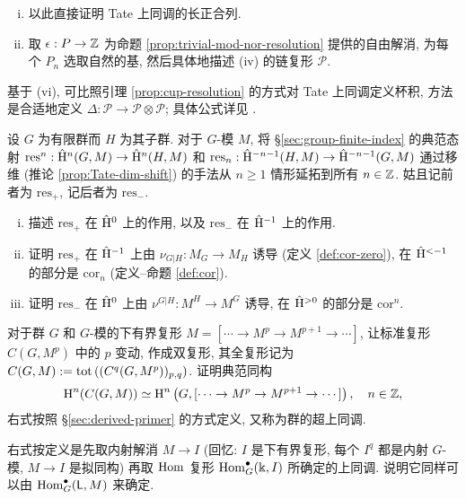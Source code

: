 \begin{Exercises}
\begin{enumerate}[(i)]
		\item 以此直接证明 Tate 上同调的长正合列.
		
		\item 取 $\epsilon: P \to \mathbb{Z}$ 为命题 \ref{prop:trivial-mod-nor-resolution} 提供的自由解消, 为每个 $P_n$ 选取自然的基, 然后具体地描述 (iv) 的链复形 $\mathcal{P}$.
	\end{enumerate}

	基于 (vi), 可比照引理 \ref{prop:cup-resolution} 的方式对 Tate 上同调定义杯积, 方法是合适地定义 $\Delta: \mathcal{P} \to \mathcal{P} \otimes \mathcal{P}$; 具体公式详见 \cite[Chapter IV, \S 7]{CF67}.

	\item 设 $G$ 为有限群而 $H$ 为其子群. 对于 $G$-模 $M$, 将 \S\ref{sec:group-finite-index} 的典范态射 $\mathrm{res}^n: \hat{\mathrm{H}}^n(G, M) \to \hat{\mathrm{H}}^n(H, M)$ 和 $\mathrm{res}_n: \hat{\mathrm{H}}^{-n-1}(H, M) \to \hat{\mathrm{H}}^{-n-1}(G, M)$ 通过移维 (推论 \ref{prop:Tate-dim-shift}) 的手法从 $n \geq 1$ 情形延拓到所有 $n \in \mathbb{Z}$. 姑且记前者为 $\mathrm{res}_+$, 记后者为 $\mathrm{res}_-$.
	\begin{enumerate}[(i)]
		\item 描述 $\mathrm{res}_+$ 在 $\hat{\mathrm{H}}^0$ 上的作用, 以及 $\mathrm{res}_-$ 在 $\hat{\mathrm{H}}^{-1}$ 上的作用.
		\item 证明 $\mathrm{res}_+$ 在 $\hat{\mathrm{H}}^{-1}$ 上由 $\nu_{G|H}: M_G \to M_H$ 诱导 (定义 \ref{def:cor-zero}), 在 $\hat{\mathrm{H}}^{< -1}$ 的部分是 $\mathrm{cor}_n$ (定义--命题 \ref{def:cor}).
		\item 证明 $\mathrm{res}_-$ 在 $\hat{\mathrm{H}}^0$ 上由 $\nu^{G|H}: M^H \to M^G$ 诱导, 在 $\hat{\mathrm{H}}^{> 0}$ 的部分是 $\mathrm{cor}^n$.
	\end{enumerate}

	\item 对于群 $G$ 和 $G$-模的下有界复形 $M = [\cdots \to M^p \to M^{p+1} \to \cdots]$, 让标准复形 $C(G, M^p)$ 中的 $p$ 变动, 作成双复形, 其全复形记为 $C(G, M) := \operatorname{tot}\left((C^q(G, M^p))_{p, q}\right)$. 证明典范同构
	\[ \operatorname{H}^n(C(G, M)) \simeq \operatorname{H}^n\left(G, [\cdots \to M^p \to M^{p+1} \to \cdots]\right), \quad n \in \mathbb{Z}, \]
	右式按照 \S\ref{sec:derived-primer} 的方式定义, 又称为群的超上同调.
	
	\begin{hint}
		右式按定义是先取内射解消 $M \to I$ (回忆: $I$ 是下有界复形, 每个 $I^q$ 都是内射 $G$-模, $M \to I$ 是拟同构) 再取 $\operatorname{Hom}$ 复形 $\operatorname{Hom}^\bullet_G(\Bbbk, I)$ 所确定的上同调. 说明它同样可以由 $\operatorname{Hom}^\bullet_G(\mathsf{L}, M)$ 来确定.
	\end{hint}
	

\end{Exercises}
